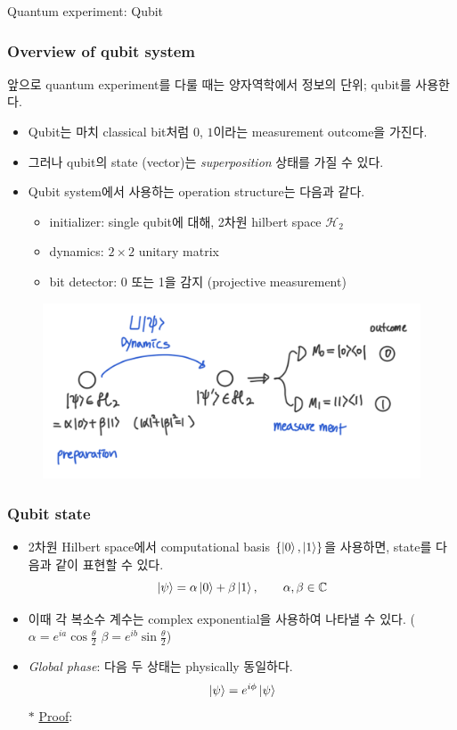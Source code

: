 \documentclass[9pt]{beamer}
\begin{document}
    \begin{section}{Quantum experiment: Qubit}
        \begin{frame}
            \frametitle{Overview of qubit system}
            앞으로 quantum experiment를 다룰 때는 양자역학에서 \alert{정보의 단위}; qubit를 사용한다.
            \begin{itemize}
                \item Qubit는 마치 classical bit처럼 $0$, $1$이라는 measurement outcome을 가진다.
                \item 그러나 qubit의 state (vector)는 \textit{superposition} 상태를 가질 수 있다.
                \item Qubit system에서 사용하는 operation structure는 다음과 같다.
                \begin{itemize}
                    \item initializer: single qubit에 대해, 2차원 hilbert space $\mathcal{H}_2$
                    \item dynamics: $2\times 2$ unitary matrix
                    \item bit detector: 0 또는 1을 감지 (projective measurement)
                    
                \end{itemize}
            \end{itemize}
            \vspace{0.1cm}
            \begin{figure}
                \includegraphics[width=0.6\columnwidth]{image/L1_qubit.png}
            \end{figure}
        \end{frame}

        \begin{frame}
            \frametitle{Qubit state}
                \begin{itemize}
                    \item 2차원 Hilbert space에서 computational basis $\{\ket 0, \ket 1\}$을 사용하면, state를 다음과 같이 표현할 수 있다.
                    $$ \ket{\psi} = \alpha \ket 0 + \beta \ket 1,\qquad \alpha, \beta \in \mathbb C$$
                    \item 이때 각 복소수 계수는 complex exponential을 사용하여 나타낼 수 있다. %
                    ($ \alpha = e^{ia} \cos \frac{\theta}{2}$ $\beta = e^{ib} \sin \frac{\theta}{2}$)
                    \item \textit{Global phase}: 다음 두 상태는 physically 동일하다.
                    $$ \ket \psi = e^{i\phi} \ket \psi$$ 
                    $\ast$ \underline{Proof}:
                    \vspace{0.5cm}


\end{itemize}
\end{frame}
\end{section}
\end{document}
